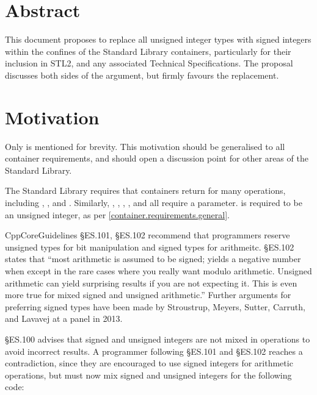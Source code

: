 
\maketitle

\section*{Abstract}
This document proposes to replace all unsigned integer types with signed integers within the
confines of the Standard Library containers, particularly for their inclusion in STL2, and any
associated Technical Specifications. The proposal discusses both sides of the argument, but firmly
favours the replacement.

\section*{Motivation}
Only  is mentioned for brevity. This motivation should be generalised to all container
requirements, and should open a discussion point for other areas of the Standard Library.

The Standard Library requires that containers return  for many operations,
including , , and . Similarly, ,
, , , and  all require a 
parameter.  is required to be an unsigned integer, as per
\ref{container.requirements.general}.

CppCoreGuidelines\cite{stroustrup15} \S ES.101, \S ES.102 recommend that programmers reserve
unsigned types for bit manipulation and signed types for arithmeitc. \S ES.102 states that ``most
arithmetic is assumed to be signed;  yields a negative number when  except in
the rare cases where you really want modulo arithmetic. Unsigned arithmetic can yield surprising
results if you are not expecting it. This is even more true for mixed signed and unsigned
arithmetic.'' Further arguments for preferring signed types have been made by Stroustrup, Meyers,
Sutter, Carruth, and Lavavej at a panel in 2013\cite{panel}.

\cite{stroustrup15}\S ES.100 advises that signed and unsigned integers are not mixed in operations
to avoid incorrect results. A programmer following \S ES.101 and
\S ES.102 reaches a contradiction, since they are encouraged to use signed integers for arithmetic
operations, but must now mix signed and unsigned integers for the following code:

